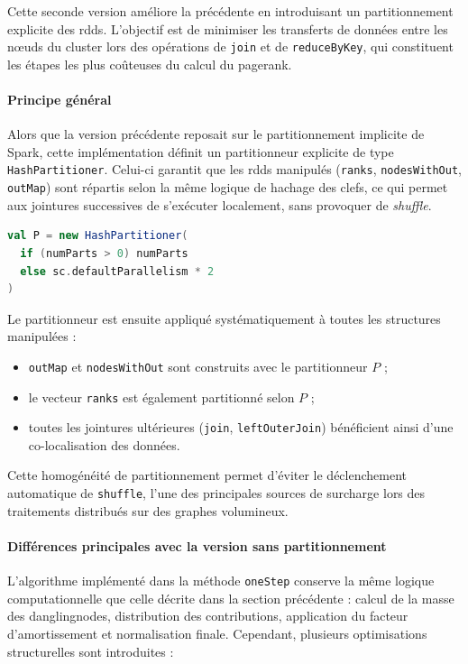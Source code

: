 \documentclass[conference]{IEEEtran}
\begin{document}
Cette seconde version améliore la précédente en introduisant un partitionnement explicite des \glspl{rdd}.  
L'objectif est de minimiser les transferts de données entre les nœuds du \gls{cluster} lors des opérations de \texttt{join} et de \texttt{reduceByKey}, qui constituent les étapes les plus coûteuses du calcul du \gls{pagerank}.  

\paragraph{Principe général}

Alors que la version précédente reposait sur le partitionnement implicite de Spark, cette implémentation définit un partitionneur explicite de type \texttt{HashPartitioner}.  
Celui-ci garantit que les \glspl{rdd} manipulés (\texttt{ranks}, \texttt{nodesWithOut}, \texttt{outMap}) sont répartis selon la même logique de hachage des clefs, ce qui permet aux jointures successives de s'exécuter localement, sans provoquer de \textit{shuffle}.

\begin{lstlisting}[language=Scala]
val P = new HashPartitioner(
  if (numParts > 0) numParts
  else sc.defaultParallelism * 2
)
\end{lstlisting}

Le \og partitionneur \fg{} est ensuite appliqué systématiquement à toutes les structures manipulées :
\begin{itemize}
  \item \texttt{outMap} et \texttt{nodesWithOut} sont construits avec le \og partitionneur \fg{} $P$ ;
  \item le vecteur \texttt{ranks} est également partitionné selon $P$ ;
  \item toutes les jointures ultérieures (\texttt{join}, \texttt{leftOuterJoin}) bénéficient ainsi d'une co-localisation des données.
\end{itemize}

Cette homogénéité de partitionnement permet d'éviter le déclenchement automatique de \texttt{shuffle}, l'une des principales sources de surcharge lors des traitements distribués sur des graphes volumineux.

\paragraph{Différences principales avec la version sans partitionnement}

L'algorithme implémenté dans la méthode \texttt{oneStep} conserve la même logique computationnelle que celle décrite dans la section précédente : calcul de la masse des \glspl{danglingnode}, distribution des contributions, application du facteur d'amortissement et normalisation finale.  
Cependant, plusieurs optimisations structurelles sont introduites :
\end{document}

